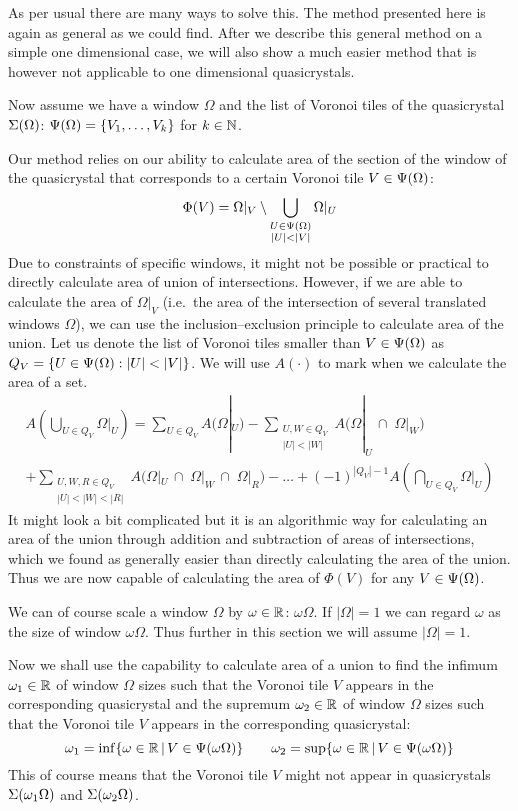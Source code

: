 \documentclass[text.tex]{subfiles}
\begin{document}
As per usual there are many ways to solve this. The method presented here is again as general as we could find. After we describe this general method on a simple one dimensional case, we will also show a much easier method that is however not applicable to one dimensional quasicrystals. 

Now assume we have a window $\Omega$ and the list of Voronoi tiles of the quasicrystal $\Sigma(\Omega)$: $\Psi(\Omega) = \{V_1,\dots,V_k\}$ for $k\in\mathbb{N}$. 

Our method relies on our ability to calculate area of the section of the window of the quasicrystal that corresponds to a certain Voronoi tile $V\in\Psi(\Omega)$: 
$$\Phi(V) = \Omega|_{V}\setminus\bigcup_{\substack{U\in\quasilist{\Omega}\\|U|<|V|}}\Omega|_{U}$$
Due to constraints of specific windows, it might not be possible or practical to directly calculate area of union of intersections. However, if we are able to calculate the area of $\Omega|_{V}$ (i.e.\ the area of the intersection of several translated windows $\Omega$), we can use the inclusion--exclusion principle to calculate area of the union. Let us denote the list of Voronoi tiles smaller than $V\in\Psi(\Omega)$ as $Q_V = \{U\in\quasilist{\Omega}:|U|<|V|\}$. We will use $A(\cdot)$ to mark when we calculate the area of a set. 
\begin{multline*}
A\left(\bigcup_{U\in Q_V}\Omega|_{U}\right) = \sum_{U\in Q_V}A\big(\Omega|_U\big) - \sum_{\substack{U,W\in Q_V\\ |U|<|W|}}A\big(\Omega|_U\,\cap\;\Omega|_W\big)\\
+\sum_{\substack{U,W,R\in Q_V\\ |U|<|W|<|R|}}A\big(\Omega|_U\,\cap\;\Omega|_W\,\cap\;\Omega|_R\big) - \dots + (-1)^{|Q_V|-1}A\left(\bigcap_{U\in Q_V} \Omega|_U\right)
\end{multline*}
It might look a bit complicated but it is an algorithmic way for calculating an area of the union through addition and subtraction of areas of intersections, which we found as generally easier than directly calculating the area of the union. Thus we are now capable of calculating the area of $\Phi(V)$ for any $V\in\Psi(\Omega)$. 

We can of course scale a window $\Omega$ by $\omega\in\mathbb{R}$: $\omega\Omega$. If $|\Omega|=1$ we can regard $\omega$ as the size of window $\omega\Omega$. Thus further in this section we will assume $|\Omega|=1$. 

Now we shall use the capability to calculate area of a union to find the infimum $\omega_1\in\mathbb{R}$ of window $\Omega$ sizes such that the Voronoi tile $V$ appears in the corresponding quasicrystal and the supremum $\omega_2\in\mathbb{R}$ of window $\Omega$ sizes such that the Voronoi tile $V$ appears in the corresponding quasicrystal:
$$\omega_1 = \inf\{\omega\in\mathbb{R} \,|\, V\in\Psi(\omega\Omega)\} \qquad \omega_2 = \sup\{\omega\in\mathbb{R} \,|\, V\in\Psi(\omega\Omega)\}$$
This of course means that the Voronoi tile $V$ might not appear in quasicrystals $\Sigma(\omega_1\Omega)$ and $\Sigma(\omega_2\Omega)$. 
\end{document}
